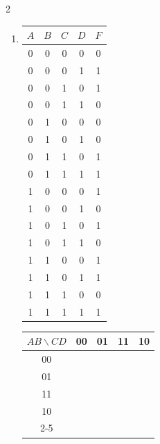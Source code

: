 \documentclass[12pt,a4paper]{article}
\begin{document}
\begin{multicols}{2}
\begin{enumerate}[label=\alph*)]
  \item \begin{minipage}[t]{\linewidth}
    \begin{center}
      \begin{tabular}{cccc|c}
        \toprule
        $A$ & $B$ & $C$ & $D$ & $F$ \\
        \midrule
        0 & 0 & 0 & 0 & 0 \\
        0 & 0 & 0 & 1 & 1 \\
        0 & 0 & 1 & 0 & 1 \\
        0 & 0 & 1 & 1 & 0 \\
        0 & 1 & 0 & 0 & 0 \\
        0 & 1 & 0 & 1 & 0 \\
        0 & 1 & 1 & 0 & 1 \\
        0 & 1 & 1 & 1 & 1 \\
        1 & 0 & 0 & 0 & 1 \\
        1 & 0 & 0 & 1 & 0 \\
        1 & 0 & 1 & 0 & 1 \\
        1 & 0 & 1 & 1 & 0 \\
        1 & 1 & 0 & 0 & 1 \\
        1 & 1 & 0 & 1 & 1 \\
        1 & 1 & 1 & 0 & 0 \\
        1 & 1 & 1 & 1 & 1 \\
        \bottomrule
      \end{tabular}
    \end{center}

    \begin{center}
      \begin{tabular}{c|c|c|c|c|}
        $AB \backslash CD$ & 00 & 01 & 11 & \multicolumn{1}{c}{10} \\
        \hline
        00 & \phantom{0} & \phantom{0} & \phantom{0} & \phantom{0} \\
        \hline
        01 & \phantom{0} & \phantom{0} & \phantom{0} & \phantom{0} \\
        \hline
        11 & \phantom{0} & \phantom{0} & \phantom{0} & \phantom{0} \\
        \hline
        10 & \phantom{0} & \phantom{0} & \phantom{0} & \phantom{0} \\
        \cline{2-5}
      \end{tabular}
    \end{center}
  \end{minipage}


\end{enumerate}
\end{multicols}
\end{document}

